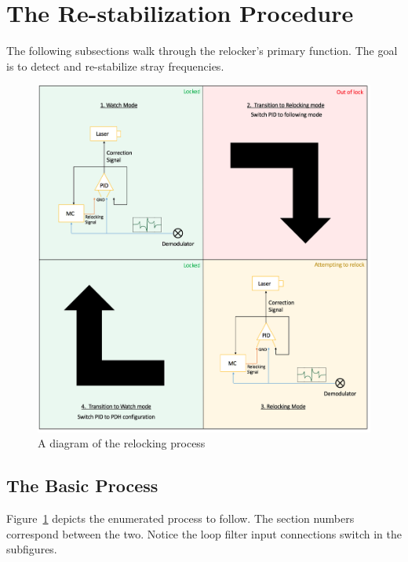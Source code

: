 \documentclass[10pt]{report}
\begin{document}
\section{The Re-stabilization Procedure}

The following subsections walk through the relocker's primary function. The goal is to detect and re-stabilize stray frequencies.

\begin{figure}[h!]
	\includegraphics[scale=.41]{includes/relocking_schematic}
	\centering
	\caption{A diagram of the relocking process}
	\label{fig:relocking_schematic}
\end{figure}

\subsection{The Basic Process}

Figure~\ref{fig:relocking_schematic} depicts the enumerated process to follow. The section numbers correspond between the two. Notice the loop filter input connections switch in the subfigures.
\end{document}

